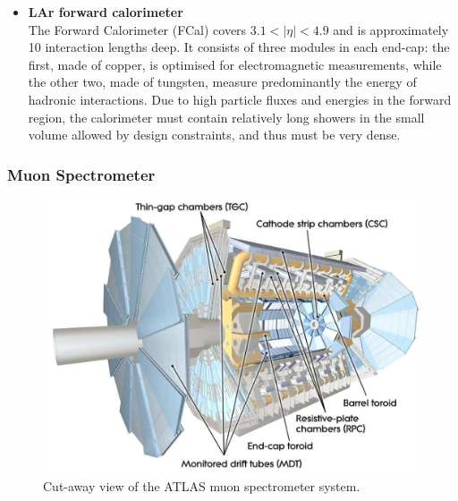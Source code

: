 \begin{itemize}
		\item  \textbf{LAr forward calorimeter}\\
		The Forward Calorimeter (FCal) covers $3.1 < |\eta| < 4.9 $ and
		is approximately 10 interaction lengths deep. 
		It consists of three modules in each end-cap: 
		the first, made of copper, is optimised for	electromagnetic measurements, 
		while the other two, made of tungsten, measure predominantly the
		energy of hadronic interactions. 
		Due to high particle fluxes and
		energies in the forward region, the calorimeter must contain 
		relatively long showers in the small volume
		allowed by design constraints, and thus must be very dense.

	\end{itemize}

	\subsubsection{Muon Spectrometer}
	
	\begin{figure}[bht]
		\begin{centering}	
		\includegraphics[width=.6\textwidth]{Detector_plots/Muon.png}
		\caption{Cut-away view of the ATLAS muon spectrometer system.}
		\label{fig:MS}
		\end{centering}
	\end{figure}
	
